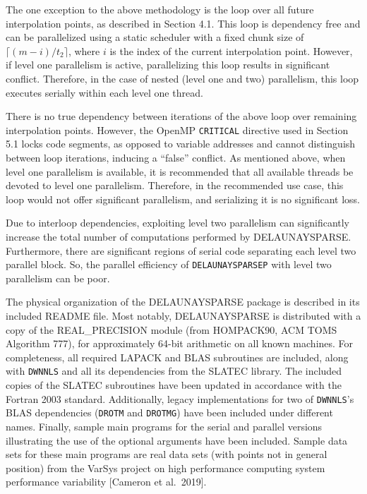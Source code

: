 {The one exception to the above methodology is the loop over all future
interpolation points, as described in Section 4.1. This loop is dependency
free and can be parallelized using a static scheduler with a fixed chunk
size of $\lceil(m-i)/t_2\rceil$, where $i$ is the index of the current
interpolation
point. However, if level one parallelism is active, parallelizing this
loop results in significant conflict. Therefore, in the case of nested
(level one and two) parallelism, this loop executes serially within
each level one thread.

\enspace
There is no true dependency between iterations of the above loop over
remaining interpolation points. However, the OpenMP {\tt CRITICAL}
directive used in Section 5.1 locks code segments, as opposed to
variable addresses and cannot distinguish between loop
iterations, inducing a ``false'' conflict. As mentioned above, when
level one parallelism is available, it is recommended that all
available threads be devoted to level one parallelism. Therefore, in
the recommended use case, this loop would not offer significant
parallelism, and serializing it is no significant loss.
\medskip

Due to interloop dependencies, exploiting level two parallelism can
significantly increase the total number of computations performed by
DELAUNAYSPARSE. Furthermore, there are significant regions of serial
code separating each level two parallel block. So, 
the parallel efficiency of {\tt DELAUNAYSPARSEP} with level two
parallelism can be poor.


The physical organization of the DELAUNAYSPARSE package is described
in its included README file. Most notably, DELAUNAYSPARSE is distributed
with a copy of the REAL\_PRECISION module (from HOMPACK90, ACM TOMS
Algorithm 777), for approximately 64-bit arithmetic on all known
machines. For completeness, all required LAPACK and BLAS subroutines
are included, along with {\tt DWNNLS} and all its dependencies from
the SLATEC library. The included copies of the SLATEC subroutines have
been updated in accordance with the Fortran 2003 standard. Additionally,
legacy implementations for two of {\tt DWNNLS}'s BLAS dependencies 
({\tt DROTM} and {\tt DROTMG}) have
been included under different names. Finally, sample main programs
for the serial and parallel versions illustrating the use of the
optional arguments have been included.
Sample data sets for these main programs are real data sets (with points
not in general position) from the VarSys project on high performance
computing system performance variability [Cameron et al.\ 2019].

}
